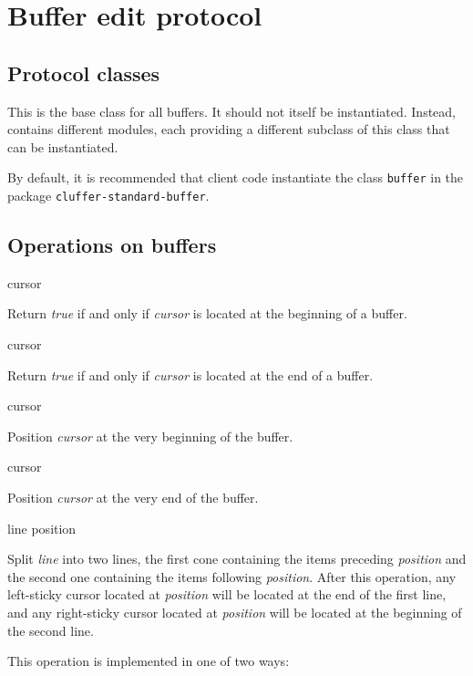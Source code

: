 \section{Buffer edit protocol}
\label{sec-buffer-edit-protocol}

\subsection{Protocol classes}


This is the base class for all buffers.  It should not itself be
instantiated.  Instead, \sysname{} contains different modules, each
providing a different subclass of this class that can be instantiated.

By default, it is recommended that client code instantiate the class
\texttt{buffer} in the package \texttt{cluffer-standard-buffer}.

\subsection{Operations on buffers}

 {cursor}

Return \textit{true} if and only if \textit{cursor} is located at the
beginning of a buffer.

 {cursor}

Return \textit{true} if and only if \textit{cursor} is located at the
end of a buffer.

 {cursor}

Position \textit{cursor} at the very beginning of the buffer.

 {cursor}

Position \textit{cursor} at the very end of the buffer.

 {line position}

Split \textit{line} into two lines, the first cone containing the
items preceding \textit{position} and the second one containing the
items following \textit{position}.  After this operation, any
left-sticky cursor located at \textit{position} will be located at the
end of the first line, and any right-sticky cursor located at
\textit{position} will be located at the beginning of the second line.

This operation is implemented in one of two ways:

